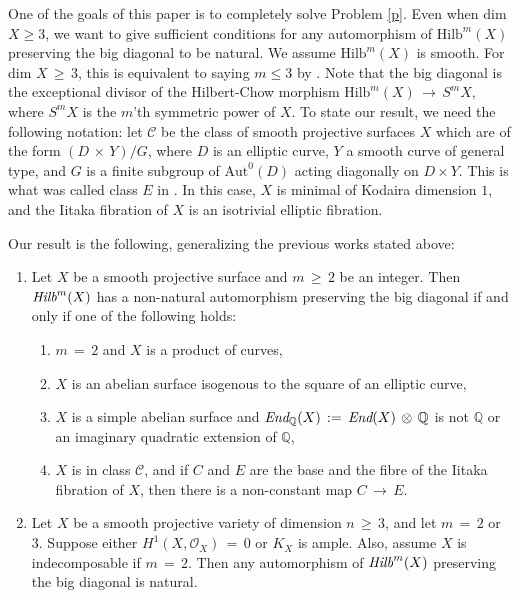 \documentclass[12pt,reqno]{amsart}
\newenvironment{manualtheorem}[1]{%
\renewcommand\themanualtheoreminner{#1}%
  \manualtheoreminner
}{\endmanualtheoreminner}
\theoremstyle{definition}
\numberwithin{equation}{section}
\begin{document}
One of the goals of this paper is to completely solve Problem \ref{p}. Even when dim $X\geq 3$, we want to give sufficient conditions for any automorphism of $\text{Hilb}^m(X)$ preserving the big diagonal to be natural. We assume $\text{Hilb}^m(X)$ is smooth. For dim $X\,\geq\, 3$, this is equivalent to saying $m\leq 3$ by \cite{skjelnes2020smooth}. Note that the big diagonal is the exceptional divisor of the Hilbert-Chow morphism $\text{Hilb}^m(X)\,\to\, S^mX,$ where $S^m X$ is the $m$'th symmetric power of $X$. To state our result, we need the following notation: let $\mathcal{C}$ be the class of smooth projective surfaces $X$ which are of the form $(D\,\times\, Y)/G$, where $D$ is an elliptic curve, $Y$ a smooth curve of general type, and $G$ is a finite subgroup of $\text{Aut}^0(D)$ acting diagonally on $D\times Y.$ This is what was called class $E$ in {\cite[Theorem D]{Fon}}. In this case, $X$ is minimal of Kodaira dimension $1$, and the Iitaka fibration of $X$ is an isotrivial elliptic fibration.

Our result is the following, generalizing the previous works stated above:

\begin{manualtheorem}{A}\label{1}
    \begin{enumerate}
        \item Let $X$ be a smooth projective surface and $m\,\geq\, 2$ be an integer. Then $\emph{Hilb}^m(X)$ has a non-natural automorphism preserving the big diagonal if and only if one of the following holds:
        \begin{enumerate}
            \item $m\,=\,2$ and $X$ is a product of curves,
            \item $X$ is an abelian surface isogenous to the square of an elliptic curve,
            \item $X$ is a simple abelian surface and $\emph{End}_{\mathbb{Q}}(X)\,:=\,\emph{End}(X)\,\otimes\, \mathbb{Q}$ is not $\mathbb{Q}$ or an imaginary quadratic extension of $\mathbb{Q}$,
            \item $X$ is in class $\mathcal{C}$, and if $C$ and $E$ are the base and the fibre of the Iitaka fibration of $X$, then there is a non-constant map $C\,\to\, E.$
        \end{enumerate}
        \item Let $X$ be a smooth projective variety of dimension $n\,\geq\, 3$, and let $m\,=\,2$ or $3$. Suppose either $H^{1}(X, \mathcal{O}_{X})\, =\, 0$ or ${K}_{X}$ is ample. Also, assume $X$ is indecomposable if $m\,=\,2$. Then any automorphism of $\emph{Hilb}^{m}(X)$ preserving the big diagonal is natural.
    \end{enumerate}
\end{manualtheorem}
\end{document}
